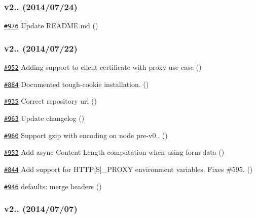 \subsubsection*{v2.. (2014/07/24)}


\begin{DoxyItemize}
\item \href{https://github.com/request/request/pull/976}{\tt \#976} Update R\+E\+A\+D\+M\+E.\+md ()
\end{DoxyItemize}

\subsubsection*{v2.. (2014/07/22)}


\begin{DoxyItemize}
\item \href{https://github.com/request/request/pull/952}{\tt \#952} Adding support to client certificate with proxy use case ()
\item \href{https://github.com/request/request/pull/884}{\tt \#884} Documented tough-\/cookie installation. ()
\item \href{https://github.com/request/request/pull/935}{\tt \#935} Correct repository url ()
\item \href{https://github.com/request/request/pull/963}{\tt \#963} Update changelog ()
\item \href{https://github.com/request/request/pull/960}{\tt \#960} Support gzip with encoding on node pre-\/v0.. ()
\item \href{https://github.com/request/request/pull/953}{\tt \#953} Add async Content-\/\+Length computation when using form-\/data ()
\item \href{https://github.com/request/request/pull/844}{\tt \#844} Add support for H\+T\+TP\mbox{[}S\mbox{]}\+\_\+\+P\+R\+O\+XY environment variables. Fixes \#595. ()
\item \href{https://github.com/request/request/pull/946}{\tt \#946} defaults\+: merge headers ()
\end{DoxyItemize}

\subsubsection*{v2.. (2014/07/07)}


